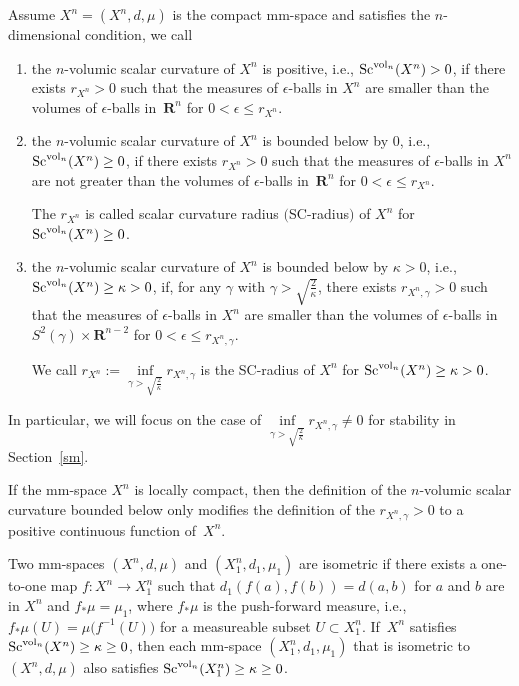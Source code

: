 \documentclass[10pt,a4paper]{amsart}
\begin{document}
\begin{Definition}
Assume $X^n=(X^n, d, \mu)$ is the compact mm-space and satisfies the $n$-dimensional condition, we call
\begin{enumerate}\itemsep=0pt
\item[$1.$] the $n$-volumic scalar curvature of $X^n$ is positive, i.e., ${\rm Sc}^{{\rm vol}_n}(X^n)> 0$, if there exists $r_{X^n} > 0$ such that the measures of $\epsilon$-balls in $X^n$ are smaller than the volumes of $\epsilon$-balls in~$\mathbf{R}^n$ for $0 < \epsilon \leq r_{X^n}$.
\item[$2.$] the $n$-volumic scalar curvature of $X^n$ is bounded below by 0, i.e., ${\rm Sc}^{{\rm vol}_n}(X^n)\geq 0$, if there exists $r_{X^n} > 0$ such that the measures of $\epsilon$-balls in $X^n$ are not greater than the volumes of $\epsilon$-balls in~$ \mathbf{R}^{n}$ for $0 < \epsilon \leq r_{X^n}$.

The $r_{X^n}$ is called scalar curvature radius $($SC-radius$)$ of $X^n$ for ${\rm Sc}^{{\rm vol}_n}(X^n)\geq 0$.

\item[$3.$] the $n$-volumic scalar curvature of $X^n$ is bounded below by $\kappa>0$, i.e., ${\rm Sc}^{{\rm vol}_n}(X^n)\geq\kappa>0$, if, for any $\gamma$ with $\gamma> \sqrt{\frac{2}{\kappa}}$, there exists $r_{X^n,\gamma} >0$ such that the measures of $\epsilon$-balls in $X^n$ are smaller than the volumes of $\epsilon$-balls in $S^2(\gamma)\times \mathbf{R}^{n-2}$ for $0 < \epsilon \leq r_{X^n,\gamma}$.

We call $r_{X^n}:=\inf\limits_{\gamma> \sqrt{\frac{2}{\kappa}}} r_{X^n,\gamma}$ is the SC-radius of $X^n$ for ${\rm Sc}^{{\rm vol}_n}(X^n)\geq\kappa>0$.
 \end{enumerate}
\end{Definition}

In particular, we will focus on the case of $\inf\limits_{\gamma> \sqrt{\frac{2}{\kappa}}} r_{X^n,\gamma}\neq 0$ for stability in Section~\ref{sm}.

If the mm-space $X^n$ is locally compact, then the definition of the $n$-volumic scalar curvature bounded below only modifies the definition of the $r_{X^n,\gamma} >0$ to a positive continuous function of~$X^n$.

Two mm-spaces $(X^n, d, \mu)$ and $(X^n_1, d_1, \mu_1)$ are isometric if there exists a one-to-one map $f\colon X^n \to X^n_1$ such that $d_1(f(a),f(b))=d(a,b)$ for $a$ and $b$ are in $X^n$ and $f_*\mu=\mu_1$, where $f_*\mu$ is the push-forward measure, i.e., $f_*\mu(U)=\mu\big(f^{-1}(U)\big)$ for a measureable subset $U\subset X^n_1$. If~$X^n$ satisfies ${\rm Sc}^{{\rm vol}_n}(X^n)\geq\kappa\geq 0$, then each mm-space $(X^n_1, d_1, \mu_1)$ that is isometric to $(X^n, d, \mu)$ also satisfies ${\rm Sc}^{{\rm vol}_n}(X^n_1)\geq\kappa\geq 0$.
\end{document}
